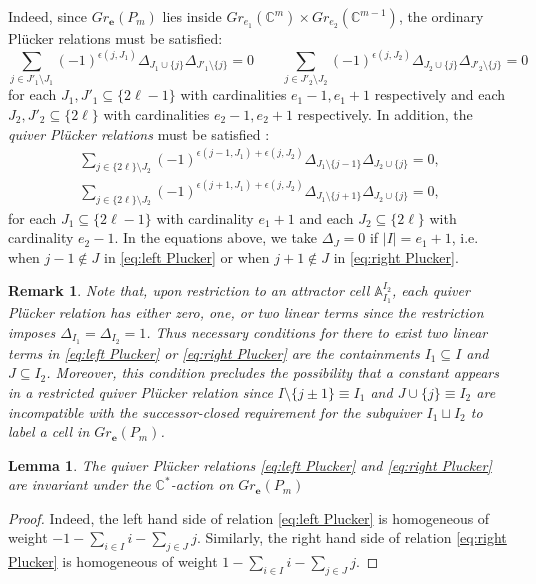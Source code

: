 \documentclass{amsart}
\newtheorem{lemma}[theorem]{Lemma}
\newtheorem{remark}[theorem]{Remark}
\numberwithin{equation}{section}
\renewcommand{\AA}{\mathbb{A}}
\newcommand{\CC}{\mathbb{C}}
\newcommand{\bfe}{\mathbf{e}}
\begin{document}
  Indeed, since $Gr_\bfe(P_m)$ lies inside $Gr_{e_1}(\CC^m)\times Gr_{e_2}(\CC^{m-1})$, the ordinary Pl\"ucker relations must be satisfied:
  \[\sum_{j\in J'_1\setminus J_1} (-1)^{\epsilon(j,J_1)} \Delta_{J_1\cup\{j\}} \Delta_{J'_1\setminus\{j\}}=0
    \qquad
    \sum_{j\in J'_2\setminus J_2} (-1)^{\epsilon(j,J_2)} \Delta_{J_2\cup\{j\}} \Delta_{J'_2\setminus\{j\}}=0\]
  for each $J_1,J'_1\subseteq\{2\ell-1\}$ with cardinalities $e_1-1,e_1+1$ respectively and each $J_2,J'_2\subseteq\{2\ell\}$ with cardinalities $e_2-1,e_2+1$ respectively.
  In addition, the \emph{quiver Pl\"ucker relations} must be satisfied \cite{lorscheid-weist}:
  \begin{align}
    \label{eq:left Plucker} \sum_{j\in \{2\ell\}\setminus J_2} (-1)^{\epsilon(j-1,J_1)+\epsilon(j,J_2)} \Delta_{J_1\setminus\{j-1\}} \Delta_{J_2\cup\{j\}}=0,\\
    \label{eq:right Plucker} \sum_{j\in \{2\ell\}\setminus J_2} (-1)^{\epsilon(j+1,J_1)+\epsilon(j,J_2)} \Delta_{J_1\setminus\{j+1\}} \Delta_{J_2\cup\{j\}}=0,
  \end{align}
  for each $J_1\subseteq\{2\ell-1\}$ with cardinality $e_1+1$ and each $J_2\subseteq\{2\ell\}$ with cardinality $e_2-1$.
  In the equations above, we take $\Delta_J=0$ if $|I|=e_1+1$, i.e. when $j-1\notin J$ in \eqref{eq:left Plucker} or when $j+1\notin J$ in \eqref{eq:right Plucker}.
  \begin{remark}
    \label{rm:linear terms}
    Note that, upon restriction to an attractor cell $\AA_{I_1}^{I_2}$, each quiver Pl\"ucker relation has either zero, one, or two linear terms since the restriction imposes $\Delta_{I_1}=\Delta_{I_2}=1$.
    Thus necessary conditions for there to exist two linear terms in \eqref{eq:left Plucker} or \eqref{eq:right Plucker} are the containments $I_1\subseteq I$ and $J\subseteq I_2$.
    Moreover, this condition precludes the possibility that a constant appears in a restricted quiver Pl\"ucker relation since $I\setminus\{j\pm1\}\equiv I_1$ and $J\cup\{j\}\equiv I_2$ are incompatible with the successor-closed requirement for the subquiver $I_1\sqcup I_2$ to label a cell in $Gr_\bfe(P_m)$.
  \end{remark}

  \begin{lemma}
    The quiver Pl\"ucker relations \eqref{eq:left Plucker} and \eqref{eq:right Plucker} are invariant under the $\CC^*$-action on $Gr_\bfe(P_m)$
  \end{lemma}
  \begin{proof}
    Indeed, the left hand side of relation \eqref{eq:left Plucker} is homogeneous of weight $-1 - \sum\limits_{i\in I} i - \sum\limits_{j\in J} j$.
    Similarly, the right hand side of relation \eqref{eq:right Plucker} is homogeneous of weight $1 - \sum\limits_{i\in I} i - \sum\limits_{j\in J} j$.
  \end{proof}
\end{document}
